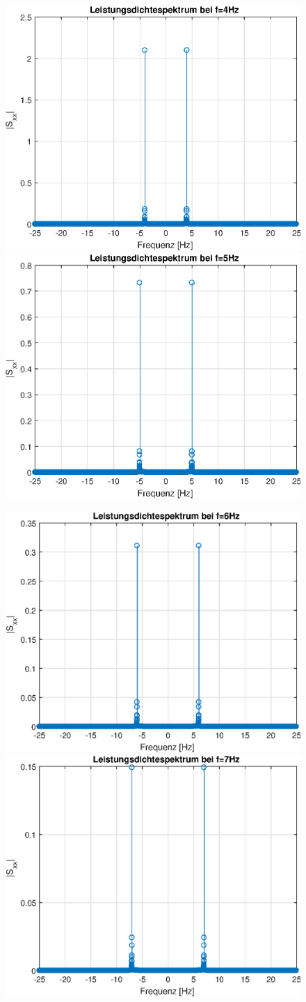 \documentclass{article}
\begin{document}
\begin{figure}[!h]
\includegraphics[width=0.5\linewidth]{img/sim_lds_sine_freq_4}
\includegraphics[width=0.5\linewidth]{img/sim_lds_sine_freq_5}
\end{figure}
\begin{figure}[!h]
\includegraphics[width=0.5\linewidth]{img/sim_lds_sine_freq_6}
\includegraphics[width=0.5\linewidth]{img/sim_lds_sine_freq_7}
\end{figure}
\end{document}
